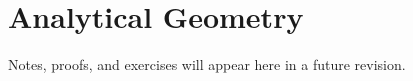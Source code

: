 \section{Analytical Geometry}

\begin{remark*}[Status]
Notes, proofs, and exercises will appear here in a future revision.
\end{remark*}



